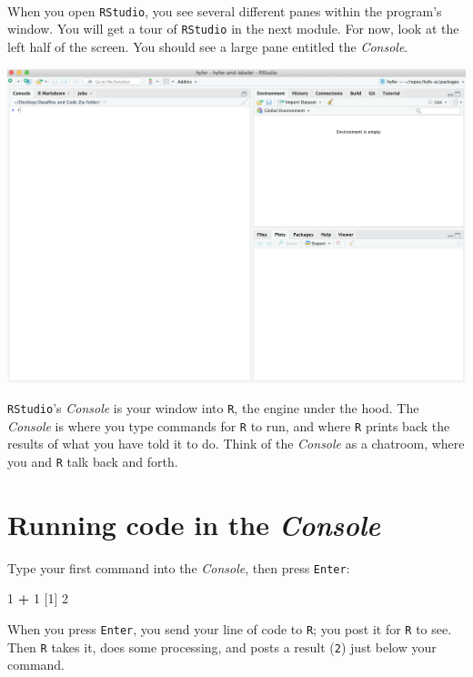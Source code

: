 \documentclass[]{book}
\newenvironment{Shaded}{\begin{snugshade}}{\end{snugshade}}
\newcommand{\DecValTok}[1]{\textcolor[rgb]{0.00,0.00,0.81}{#1}}
\newcommand{\NormalTok}[1]{#1}
\newcommand{\OperatorTok}[1]{\textcolor[rgb]{0.81,0.36,0.00}{\textbf{#1}}}
\newcommand{\StringTok}[1]{\textcolor[rgb]{0.31,0.60,0.02}{#1}}
\begin{document}
~

When you open \texttt{RStudio}, you see several different panes within the program's window. You will get a tour of \texttt{RStudio} in the next module. For now, look at the left half of the screen. You should see a large pane entitled the \emph{Console}.

\includegraphics{img/rstudio_firstopen.png}

\texttt{RStudio}'s \emph{Console} is your window into \texttt{R}, the engine under the hood. The \emph{Console} is where you type commands for \texttt{R} to run, and where \texttt{R} prints back the results of what you have told it to do. Think of the \emph{Console} as a chatroom, where you and \texttt{R} talk back and forth.

\hypertarget{running-code-in-the-console}{%
\section*{\texorpdfstring{Running code in the \emph{Console}}{Running code in the Console}}\label{running-code-in-the-console}}

Type your first command into the \emph{Console}, then press \texttt{Enter}:

\begin{Shaded}
\begin{Highlighting}[]
\DecValTok{1} \OperatorTok{+}\StringTok{ }\DecValTok{1}
\NormalTok{[}\DecValTok{1}\NormalTok{] }\DecValTok{2}
\end{Highlighting}
\end{Shaded}

When you press \texttt{Enter}, you send your line of code to \texttt{R}; you post it for \texttt{R} to see. Then \texttt{R} takes it, does some processing, and posts a result (\texttt{2}) just below your command.
\end{document}
